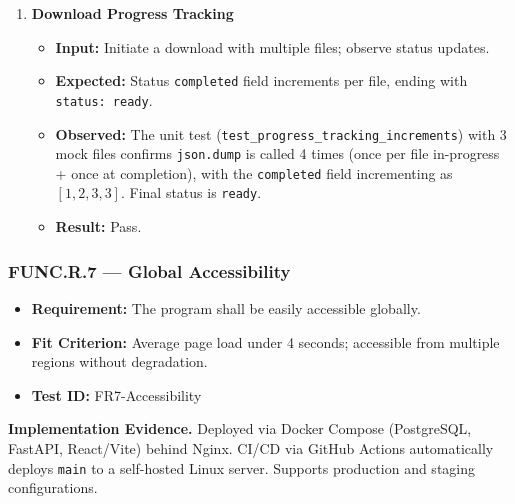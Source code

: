 \documentclass[12pt, titlepage]{article}
\begin{document}
\begin{enumerate}[label=\textbf{FR6-T\arabic*:}, leftmargin=*, labelsep=1em]
  \item \textbf{Download Progress Tracking}
  \begin{itemize}
    \item \textbf{Input:} Initiate a download with multiple files; observe status updates.
    \item \textbf{Expected:} Status \texttt{completed} field increments per file, ending with \texttt{status: ready}.
    \item \textbf{Observed:} The unit test (\texttt{test\_\allowbreak{}progress\_\allowbreak{}tracking\_\allowbreak{}increments}) with 3 mock files
      confirms \texttt{json.dump} is called 4 times (once per file in-progress + once at completion),
      with the \texttt{completed} field incrementing as $[1, 2, 3, 3]$. Final status is \texttt{ready}.
    \item \textbf{Result:} Pass.
  \end{itemize}

\end{enumerate}

\subsubsection{FUNC.R.7 --- Global Accessibility}

\begin{itemize}
  \item \textbf{Requirement:} The program shall be easily accessible globally.
  \item \textbf{Fit Criterion:} Average page load under 4 seconds; accessible from multiple regions without degradation.
  \item \textbf{Test ID:} FR7-Accessibility
\end{itemize}

\noindent\textbf{Implementation Evidence.}
Deployed via Docker Compose (PostgreSQL, FastAPI, React/Vite) behind Nginx. CI/CD via GitHub Actions
automatically deploys \texttt{main} to a self-hosted Linux server. Supports production and staging configurations.
\end{document}
